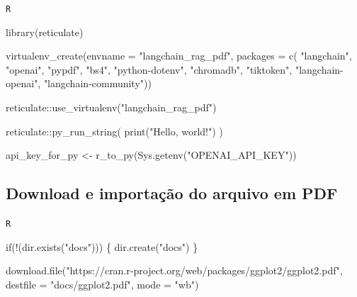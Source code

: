 \documentclass[
  letterpaper,
  DIV=11,
  numbers=noendperiod]{scrartcl}
\newenvironment{Shaded}{\begin{snugshade}}{\end{snugshade}}
\newcommand{\AttributeTok}[1]{\textcolor[rgb]{0.40,0.45,0.13}{#1}}
\newcommand{\ControlFlowTok}[1]{\textcolor[rgb]{0.00,0.23,0.31}{#1}}
\newcommand{\FunctionTok}[1]{\textcolor[rgb]{0.28,0.35,0.67}{#1}}
\newcommand{\NormalTok}[1]{\textcolor[rgb]{0.00,0.23,0.31}{#1}}
\newcommand{\OtherTok}[1]{\textcolor[rgb]{0.00,0.23,0.31}{#1}}
\newcommand{\SpecialCharTok}[1]{\textcolor[rgb]{0.37,0.37,0.37}{#1}}
\newcommand{\StringTok}[1]{\textcolor[rgb]{0.13,0.47,0.30}{#1}}
\begin{document}
\begin{codelisting}

\caption{\texttt{R}}

\begin{Shaded}
\begin{Highlighting}[]
\FunctionTok{library}\NormalTok{(reticulate)}

\FunctionTok{virtualenv\_create}\NormalTok{(}\AttributeTok{envname =} \StringTok{"langchain\_rag\_pdf"}\NormalTok{,}
                  \AttributeTok{packages =} \FunctionTok{c}\NormalTok{( }\StringTok{"langchain"}\NormalTok{, }\StringTok{"openai"}\NormalTok{, }\StringTok{"pypdf"}\NormalTok{, }\StringTok{"bs4"}\NormalTok{,}
                                \StringTok{"python{-}dotenv"}\NormalTok{, }\StringTok{"chromadb"}\NormalTok{, }\StringTok{"tiktoken"}\NormalTok{,}
                                \StringTok{"langchain{-}openai"}\NormalTok{, }\StringTok{"langchain{-}community"}\NormalTok{))}

\NormalTok{reticulate}\SpecialCharTok{::}\FunctionTok{use\_virtualenv}\NormalTok{(}\StringTok{"langchain\_rag\_pdf"}\NormalTok{)}

\NormalTok{reticulate}\SpecialCharTok{::}\FunctionTok{py\_run\_string}\NormalTok{(}\StringTok{\textquotesingle{}}
\StringTok{print("Hello, world!") }
\StringTok{\textquotesingle{}}\NormalTok{)}

\NormalTok{api\_key\_for\_py }\OtherTok{\textless{}{-}} \FunctionTok{r\_to\_py}\NormalTok{(}\FunctionTok{Sys.getenv}\NormalTok{(}\StringTok{"OPENAI\_API\_KEY"}\NormalTok{))}
\end{Highlighting}
\end{Shaded}

\end{codelisting}

\hypertarget{download-e-importauxe7uxe3o-do-arquivo-em-pdf}{%
\subsection{Download e importação do arquivo em
PDF}\label{download-e-importauxe7uxe3o-do-arquivo-em-pdf}}

\begin{codelisting}

\caption{\texttt{R}}

\begin{Shaded}
\begin{Highlighting}[]
\ControlFlowTok{if}\NormalTok{(}\SpecialCharTok{!}\NormalTok{(}\FunctionTok{dir.exists}\NormalTok{(}\StringTok{"docs"}\NormalTok{))) \{}
  \FunctionTok{dir.create}\NormalTok{(}\StringTok{"docs"}\NormalTok{)}
\NormalTok{\}}

\FunctionTok{download.file}\NormalTok{(}\StringTok{"https://cran.r{-}project.org/web/packages/ggplot2/ggplot2.pdf"}\NormalTok{,}
              \AttributeTok{destfile =} \StringTok{"docs/ggplot2.pdf"}\NormalTok{, }\AttributeTok{mode =} \StringTok{"wb"}\NormalTok{)}
\end{Highlighting}
\end{Shaded}

\end{codelisting}
\end{document}
